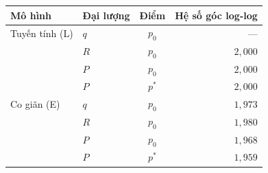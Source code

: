 
\begin{tabular}{@{}llcr@{}}
\toprule
Mô hình & Đại lượng & Điểm & Hệ số góc log-log \\
\midrule
Tuyến tính (L) & $q$ & $p_0$ & --- \\
 & $R$ & $p_0$ & $2{,}000$ \\
 & $P$ & $p_0$ & $2{,}000$ \\
 & $P$ & $p^*$ & $2{,}000$ \\
\midrule
Co giãn (E) & $q$ & $p_0$ & $1{,}973$ \\
 & $R$ & $p_0$ & $1{,}980$ \\
 & $P$ & $p_0$ & $1{,}968$ \\
 & $P$ & $p^*$ & $1{,}959$ \\
\bottomrule
\end{tabular}
